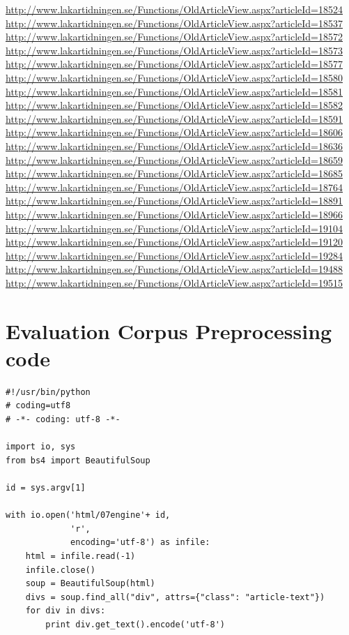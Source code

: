 \documentclass[a4paper]{report}
\begin{document}
\begin{appendices}
\begin{footnotesize}
\url{http://www.lakartidningen.se/Functions/OldArticleView.aspx?articleId=18524}
\url{http://www.lakartidningen.se/Functions/OldArticleView.aspx?articleId=18537}
\url{http://www.lakartidningen.se/Functions/OldArticleView.aspx?articleId=18572}
\url{http://www.lakartidningen.se/Functions/OldArticleView.aspx?articleId=18573}
\url{http://www.lakartidningen.se/Functions/OldArticleView.aspx?articleId=18577}
\url{http://www.lakartidningen.se/Functions/OldArticleView.aspx?articleId=18580}
\url{http://www.lakartidningen.se/Functions/OldArticleView.aspx?articleId=18581}
\url{http://www.lakartidningen.se/Functions/OldArticleView.aspx?articleId=18582}
\url{http://www.lakartidningen.se/Functions/OldArticleView.aspx?articleId=18591}
\url{http://www.lakartidningen.se/Functions/OldArticleView.aspx?articleId=18606}
\url{http://www.lakartidningen.se/Functions/OldArticleView.aspx?articleId=18636}
\url{http://www.lakartidningen.se/Functions/OldArticleView.aspx?articleId=18659}
\url{http://www.lakartidningen.se/Functions/OldArticleView.aspx?articleId=18685}
\url{http://www.lakartidningen.se/Functions/OldArticleView.aspx?articleId=18764}
\url{http://www.lakartidningen.se/Functions/OldArticleView.aspx?articleId=18891}
\url{http://www.lakartidningen.se/Functions/OldArticleView.aspx?articleId=18966}
\url{http://www.lakartidningen.se/Functions/OldArticleView.aspx?articleId=19104}
\url{http://www.lakartidningen.se/Functions/OldArticleView.aspx?articleId=19120}
\url{http://www.lakartidningen.se/Functions/OldArticleView.aspx?articleId=19284}
\url{http://www.lakartidningen.se/Functions/OldArticleView.aspx?articleId=19488}
\url{http://www.lakartidningen.se/Functions/OldArticleView.aspx?articleId=19515}
\end{footnotesize}

\chapter{Evaluation Corpus Preprocessing code}

\begin{Code}
\begin{lstlisting}[frame=single]
#!/usr/bin/python
# coding=utf8
# -*- coding: utf-8 -*-

import io, sys
from bs4 import BeautifulSoup

id = sys.argv[1]

with io.open('html/07engine'+ id,
             'r',
             encoding='utf-8') as infile:
    html = infile.read(-1)
    infile.close()
    soup = BeautifulSoup(html)
    divs = soup.find_all("div", attrs={"class": "article-text"})
    for div in divs:
        print div.get_text().encode('utf-8')


\end{lstlisting}
\end{Code}
\end{appendices}
\end{document}
